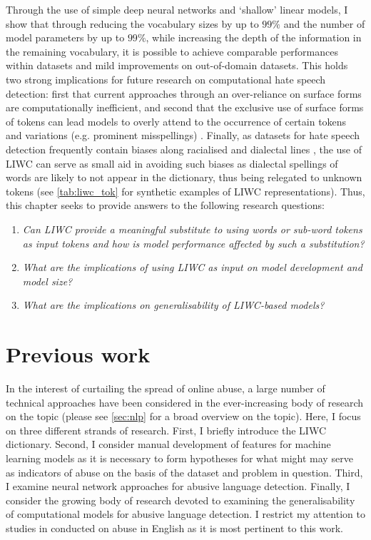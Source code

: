Through the use of simple deep neural networks and `shallow' linear models, I show that through reducing the vocabulary sizes by up to $99\%$ and the number of model parameters by up to $99\%$, while increasing the depth of the information in the remaining vocabulary, it is possible to achieve comparable performances within datasets and mild improvements on out-of-domain datasets. This holds two strong implications for future research on computational hate speech detection: first that current approaches through an over-reliance on surface forms are computationally inefficient, and second that the exclusive use of surface forms of tokens can lead models to overly attend to the occurrence of certain tokens and variations (e.g. prominent misspellings) \citep{Rottger:2021}. Finally, as datasets for hate speech detection frequently contain biases along racialised and dialectal lines \citep{Waseem:2018,Davidson:2019}, the use of LIWC can serve as small aid in avoiding such biases as dialectal spellings of words are likely to not appear in the dictionary, thus being relegated to unknown tokens (see \cref{tab:liwc_tok} for synthetic examples of LIWC representations). Thus, this chapter seeks to provide answers to the following research questions:

\begin{minipage}{0.9\textwidth}
\vspace{5mm}
    \begin{enumerate}[start=1, label={\textbf{RQ \arabic*}}]
        \item{\textit{Can LIWC provide a meaningful substitute to using words or sub-word tokens as input tokens and how is model performance affected by such a substitution?}}
        \item{\textit{What are the implications of using LIWC as input on model development and model size?}}
        \item{\textit{What are the implications on generalisability of LIWC-based models?}}
    \end{enumerate}
\end{minipage}

\section{Previous work}

In the interest of curtailing the spread of online abuse, a large number of technical approaches have been considered in the ever-increasing body of research on the topic (please see \cref{sec:nlp} for a broad overview on the topic). Here, I focus on three different strands of research. First, I briefly introduce the LIWC dictionary. Second, I consider manual development of features for machine learning models as it is necessary to form hypotheses for what might may serve as indicators of abuse on the basis of the dataset and problem in question. Third, I examine neural network approaches for abusive language detection. Finally, I consider the growing body of research devoted to examining the generalisability of computational models for abusive language detection. I restrict my attention to studies in conducted on abuse in English as it is most pertinent to this work.

